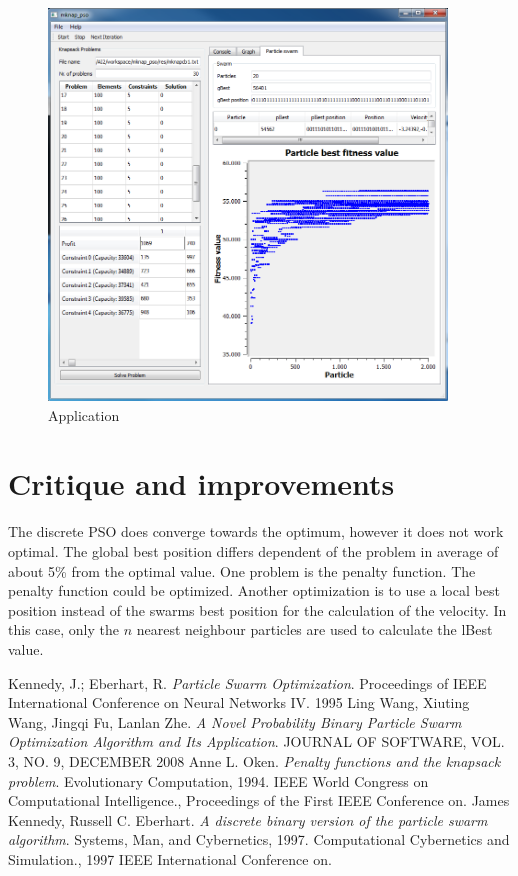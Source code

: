 \documentclass{article}
\begin{document}
\begin{figure}[H]
    \centering
    \includegraphics[width=400px]{images/image_main.PNG}
    \caption{Application}
    \label{fig-app}
\end{figure}

\section{Critique and improvements}
\label{lbl-impr}
The discrete PSO does converge towards the optimum, however it does not work optimal. The global best position differs dependent of the problem in average of about 5\% from the optimal value. One problem is the penalty function. The penalty function could be optimized. Another optimization is to use a local best position instead of the swarms best position for the calculation of the velocity. In this case, only the $n$ nearest neighbour particles are used to calculate the lBest value.

\newpage

\begin{thebibliography}{99}
		Kennedy, J.; Eberhart, R.
		\emph{Particle Swarm Optimization}.
		Proceedings of IEEE International Conference on Neural Networks IV.
		1995
		Ling Wang, Xiuting Wang, Jingqi Fu, Lanlan Zhe.
	  	\emph{A Novel Probability Binary Particle Swarm Optimization Algorithm and Its Application}.
	  	JOURNAL OF SOFTWARE, VOL. 3, NO. 9, DECEMBER 2008
		Anne L. Oken.
		\emph{Penalty functions and the knapsack problem}.
		Evolutionary Computation, 1994. IEEE World Congress on Computational Intelligence., Proceedings of the First IEEE Conference on.
		James Kennedy, Russell C. Eberhart.
		\emph{A discrete binary version of the particle swarm algorithm}.
		Systems, Man, and Cybernetics, 1997. Computational Cybernetics and Simulation., 1997 IEEE International Conference on.
\end{thebibliography}
\end{document}
